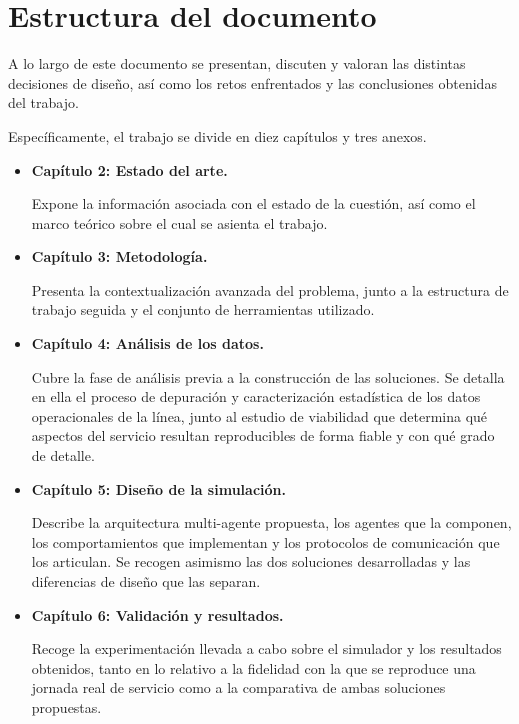 \section{Estructura del documento}

A lo largo de este documento se presentan, discuten y valoran las distintas decisiones
de diseño, así como los retos enfrentados y las conclusiones obtenidas del trabajo.

Específicamente, el trabajo se divide en diez capítulos y tres anexos.

\begin{itemize}
    \item \textbf{Capítulo 2: Estado del arte.} 
    
    Expone la información asociada con el
    estado de la cuestión, así como el marco teórico sobre el cual se asienta el trabajo.
    \item \textbf{Capítulo 3: Metodología.} 
    
    Presenta la contextualización avanzada del
    problema, junto a la estructura de trabajo seguida y el conjunto de herramientas
    utilizado.

    \item \textbf{Capítulo 4: Análisis de los datos.}
    
    Cubre la fase de análisis previa a
    la construcción de las soluciones. Se detalla en ella el proceso de depuración y
    caracterización estadística de los datos operacionales de la línea, junto al estudio
    de viabilidad que determina qué aspectos del servicio resultan reproducibles de forma
    fiable y con qué grado de detalle.

    \item \textbf{Capítulo 5: Diseño de la simulación.}
    
    Describe la arquitectura
    multi-agente propuesta, los agentes que la componen, los comportamientos que
    implementan y los protocolos de comunicación que los articulan. Se recogen asimismo
    las dos soluciones desarrolladas y las diferencias de diseño que las separan.

    \item \textbf{Capítulo 6: Validación y resultados.}
    
    Recoge la experimentación llevada a
    cabo sobre el simulador y los resultados obtenidos, tanto en lo relativo a la
    fidelidad con la que se reproduce una jornada real de servicio como a la comparativa
    de ambas soluciones propuestas.


\end{itemize}
